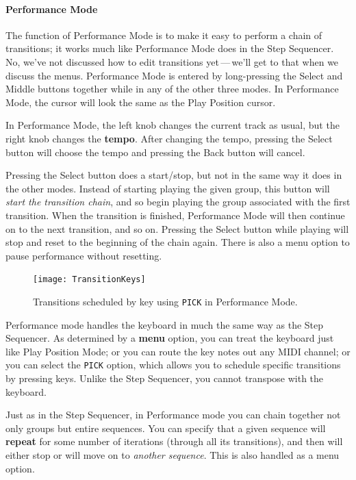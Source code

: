 \documentclass{article}
\begin{document}
\paragraph{Performance Mode}  The function of Performance Mode is to make it easy to perform a chain of transitions; it works much like Performance Mode does in the Step Sequencer. No, we've not discussed how to edit transitions yet\,---\,we'll get to that when we discuss the menus.  Performance Mode is entered by long-pressing the Select and Middle buttons together while in any of the other three modes.  In Performance Mode, the cursor will look the same as the Play Position cursor.

In Performance Mode, the left knob changes the current track as usual, but the right knob changes the {\bf tempo}.  After changing the tempo, pressing the Select button will choose the tempo and pressing the Back button will cancel.  

Pressing the Select button does a start/stop, but not in the same way it does in the other modes.  Instead of starting playing the given group, this button will {\it start the transition chain}, and so begin playing the group associated with the first transition.  When the transition is finished, Performance Mode will then continue on to the next transition, and so on.   Pressing the Select button while playing will stop and reset to the beginning of the chain again.  There is also a menu option to pause performance without resetting.

\begin{figure}
\vspace{-0.5em}
\hspace{\fill}\texttt{[image: TransitionKeys]}
\vspace{-1em}
\caption{\small Transitions scheduled by key using {\tt PICK} in Performance Mode.}
\vspace{-1em}
\label{transitionkeys}
\end{figure}

Performance mode handles the keyboard in much the same way as the Step Sequencer.  As determined by a {\bf menu} option, you can treat the keyboard just like Play Position Mode; or you can route the key notes out any MIDI channel; or you can select the {\tt PICK} option, which allows you to schedule specific transitions by pressing keys.  Unlike the Step Sequencer, you cannot transpose with the keyboard.

Just as in the Step Sequencer, in Performance mode you can chain together not only groups but entire sequences.  You can specify that a given sequence will {\bf repeat} for some number of iterations (through all its transitions), and then will either stop or will move on to {\it another sequence}.  This is also handled as a menu option.
\end{document}
